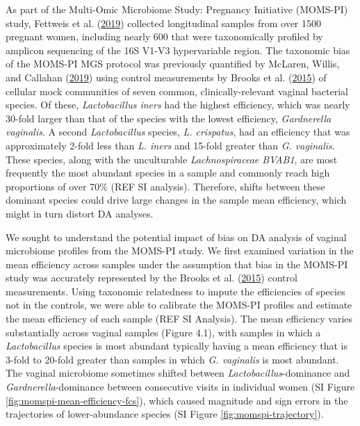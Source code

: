 \documentclass[
]{article}
\begin{document}
As part of the Multi-Omic Microbiome Study: Pregnancy Initiative (MOMS-PI) study, Fettweis et al. (\protect\hyperlink{ref-fettweis2019thev}{2019}) collected longitudinal samples from over 1500 pregnant women, including nearly 600 that were taxonomically profiled by amplicon sequencing of the 16S V1-V3 hypervariable region.
The taxonomic bias of the MOMS-PI MGS protocol was previously quantified by McLaren, Willis, and Callahan (\protect\hyperlink{ref-mclaren2019cons}{2019}) using control measurements by Brooks et al. (\protect\hyperlink{ref-brooks2015thet}{2015}) of cellular mock communities of seven common, clinically-relevant vaginal bacterial species.
Of these, \emph{Lactobacillus iners} had the highest efficiency, which was nearly 30-fold larger than that of the species with the lowest efficiency, \emph{Gardnerella vaginalis}.
A second \emph{Lactobacillus} species, \emph{L. crispatus}, had an efficiency that was approximately 2-fold less than \emph{L. iners} and 15-fold greater than \emph{G. vaginalis}.
These species, along with the unculturable \emph{Lachnospiraceae BVAB1}, are most frequently the most abundant species in a sample and commonly reach high proportions of over 70\% (REF SI analysis).
Therefore, shifts between these dominant species could drive large changes in the sample mean efficiency, which might in turn distort DA analyses.

We sought to understand the potential impact of bias on DA analysis of vaginal microbiome profiles from the MOMS-PI study.
We first examined variation in the mean efficiency across samples under the assumption that bias in the MOMS-PI study was accurately represented by the Brooks et al. (\protect\hyperlink{ref-brooks2015thet}{2015}) control measurements.
Using taxonomic relatedness to impute the efficiencies of species not in the controls, we were able to calibrate the MOMS-PI profiles and estimate the mean efficiency of each sample (REF SI Analysis).
The mean efficiency varies substantially across vaginal samples (Figure 4.1), with samples in which a \emph{Lactobacillus} species is most abundant typically having a mean efficiency that is 3-fold to 20-fold greater than samples in which \emph{G. vaginalis} is most abundant.
The vaginal microbiome sometimes shifted between \emph{Lactobacillus}-dominance and \emph{Gardnerella}-dominance between consecutive visits in individual women (SI Figure \ref{fig:momspi-mean-efficiency-fcs}), which caused magnitude and sign errors in the trajectories of lower-abundance species (SI Figure \ref{fig:momspi-trajectory}).
\end{document}
